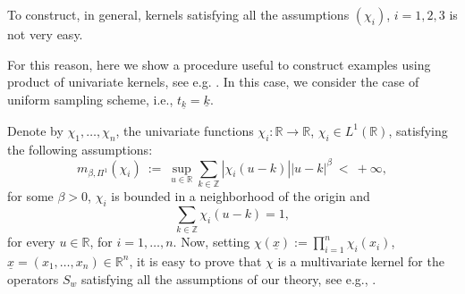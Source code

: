 \documentclass[11pt,a4paper]{article}
\newcommand{\R}{\mathbb{R}}
\newcommand{\Z}{\mathbb{Z}}
\begin{document}
  To construct, in general, kernels satisfying all the assumptions $(\chi_i)$, $i=1,2,3$ is not very easy.

 For this reason, here we show a procedure useful to construct examples using product of univariate kernels, see e.g. \cite{BUFIST,COVI,COVI2}. In this case, we consider the case of uniform sampling scheme, i.e., $t_{\underline{k}}=\underline{k}$.

 Denote by $\chi_1, \dots, \chi_n$, the univariate functions $\chi_i : \R \to \R$, $\chi_i \in L^1(\R)$, satisfying
the following assumptions:
\begin{equation} \label{uno-dim-}
m_{\beta,\Pi^1}(\chi_i)\ :=\ \sup_{u \in \R}\sum_{k \in \Z}\left|\chi_i(u-k)\right| |u-k|^{\beta}\ <\ +\infty,
\end{equation}
for some $\beta >0$, $\chi_i$ is bounded in a neighborhood of the origin and 
\begin{equation} \label{sing}
\sum_{k \in \Z}\chi_i(u-k) =1,
\end{equation}
for every $u \in \R$, for $i=1,\dots,n$. 
%
Now, setting $\chi(\underline{x}) := \prod_{i=1}^n\chi_i(x_i)$, $\underline{x}=(x_1,\dots,x_n) \in \R^n$,
it is easy to prove that $\chi$ is a multivariate kernel for the operators $S_w$ satisfying all the assumptions of our theory, see e.g., \cite{BUFIST,COVI}. 
\end{document}
